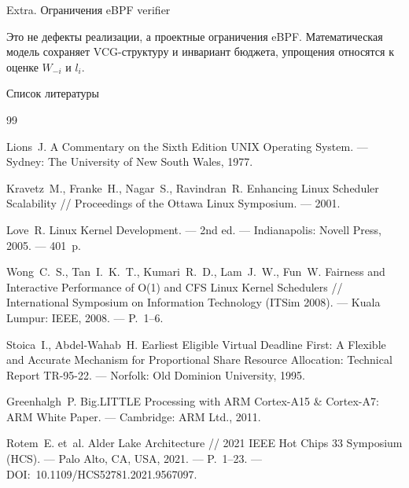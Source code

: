 \documentclass[aspectratio=169,11pt]{beamer}
\begin{document}
\begin{frame}{Extra. Ограничения eBPF verifier}
        \vspace{0.15cm}
        \begin{shadowbox}
                \scriptsize
                Это не дефекты реализации, а проектные ограничения
                eBPF. Математическая модель сохраняет VCG-структуру
                и инвариант бюджета, упрощения относятся к оценке
                $W_{-i}$ и $l_i$.
        \end{shadowbox}
\end{frame}
\addtocounter{framenumber}{-1}


\begin{frame}[allowframebreaks]{Список литературы}
        \tiny
        \begin{thebibliography}{99}
                \setlength{\itemsep}{0.35em}

                Lions~J. A Commentary on the Sixth Edition UNIX Operating
                System. --- Sydney: The University of New South Wales, 1977.

                Kravetz~M., Franke~H., Nagar~S., Ravindran~R. Enhancing
                Linux Scheduler Scalability // Proceedings of the Ottawa
                Linux Symposium. --- 2001.

                Love~R. Linux Kernel Development. --- 2nd ed. ---
                Indianapolis: Novell Press, 2005. --- 401~p.

                Wong~C.~S., Tan~I.~K.~T., Kumari~R.~D., Lam~J.~W., Fun~W.
                Fairness and Interactive Performance of O(1) and CFS
                Linux Kernel Schedulers // International Symposium on
                Information Technology (ITSim 2008). ---
                Kuala Lumpur: IEEE, 2008. --- P.~1--6.

                Stoica~I., Abdel-Wahab~H. Earliest Eligible Virtual
                Deadline First: A Flexible and Accurate Mechanism for
                Proportional Share Resource Allocation: Technical Report
                TR-95-22. --- Norfolk: Old Dominion University, 1995.

                Greenhalgh~P. Big.LITTLE Processing with ARM Cortex-A15 \&
                Cortex-A7: ARM White Paper. --- Cambridge: ARM Ltd., 2011.

                Rotem~E. et~al. Alder Lake Architecture // 2021 IEEE Hot
                Chips 33 Symposium (HCS). --- Palo Alto, CA, USA, 2021. ---
                P.~1--23. --- DOI:~10.1109/HCS52781.2021.9567097.


\end{thebibliography}
\end{frame}
\end{document}
